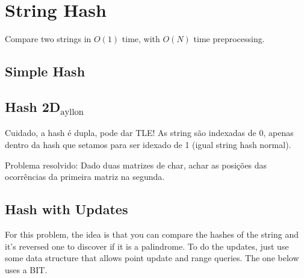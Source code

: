 \section{String Hash}
Compare two strings in $O(1)$ time, with $O(N)$ time preprocessing.
\subsection{Simple Hash}

\subsection{Hash 2D$_{\text{ayllon}}$}
Cuidado, a hash é dupla, pode dar TLE! As string são indexadas de 0, apenas dentro da hash que setamos para ser idexado de 1 (igual string hash normal).

Problema resolvido: Dado duas matrizes de char, achar as posições das ocorrências da primeira matriz na segunda.

\subsection{Hash with Updates}

For this problem, the idea is that you can compare the hashes of the string and it's reversed one to discover if it is a palindrome. To do the updates, just use some data structure that allows point update and range queries. The one below uses a BIT.
